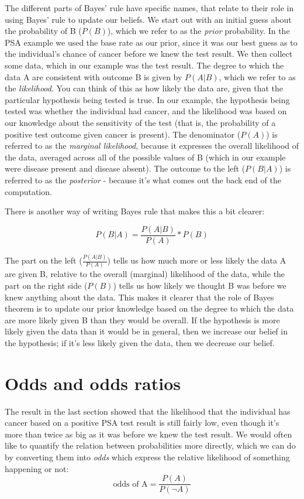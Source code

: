 \documentclass[
  12pt,
]{book}
\begin{document}
The different parts of Bayes' rule have specific names, that relate to their role in using Bayes' rule to update our beliefs. We start out with an initial guess about the probability of B (\(P(B)\)), which we refer to as the \emph{prior} probability. In the PSA example we used the base rate as our prior, since it was our best guess as to the individual's chance of cancer before we knew the test result. We then collect some data, which in our example was the test result. The degree to which the data A are consistent with outcome B is given by \(P(A|B)\), which we refer to as the \emph{likelihood}. You can think of this as how likely the data are, given that the particular hypothesis being tested is true. In our example, the hypothesis being tested was whether the individual had cancer, and the likelihood was based on our knowledge about the sensitivity of the test (that is, the probability of a positive test outcome given cancer is present). The denominator (\(P(A)\)) is referred to as the \emph{marginal likelihood}, because it expresses the overall likelihood of the data, averaged across all of the possible values of B (which in our example were disease present and disease absent).
The outcome to the left (\(P(B|A)\)) is referred to as the \emph{posterior} - because it's what comes out the back end of the computation.

There is another way of writing Bayes rule that makes this a bit clearer:

\[
P(B|A) = \frac{P(A|B)}{P(A)}*P(B)
\]

The part on the left (\(\frac{P(A|B)}{P(A)}\)) tells us how much more or less likely the data A are given B, relative to the overall (marginal) likelihood of the data, while the part on the right side (\(P(B)\)) tells us how likely we thought B was before we knew anything about the data. This makes it clearer that the role of Bayes theorem is to update our prior knowledge based on the degree to which the data are more likely given B than they would be overall. If the hypothesis is more likely given the data than it would be in general, then we increase our belief in the hypothesis; if it's less likely given the data, then we decrease our belief.

\hypertarget{odds-and-odds-ratios}{%
\section{Odds and odds ratios}\label{odds-and-odds-ratios}}

The result in the last section showed that the likelihood that the individual has cancer based on a positive PSA test result is still fairly low, even though it's more than twice as big as it was before we knew the test result. We would often like to quantify the relation between probabilities more directly, which we can do by converting them into \emph{odds} which express the relative likelihood of something happening or not:\\
\[
\text{odds of A} = \frac{P(A)}{P(\neg A)}
\]
\end{document}
